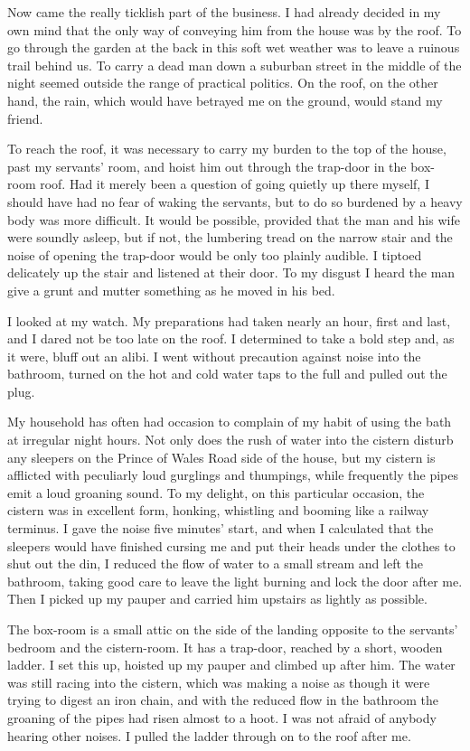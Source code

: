 Now came the really ticklish part of the business. I had already decided in my own mind that the only way of conveying him from the house was by the roof. To go through the garden at the back in this soft wet weather was to leave a ruinous trail behind us. To carry a dead man down a suburban street in the middle of the night seemed outside the range of practical politics. On the roof, on the other hand, the rain, which would have betrayed me on the ground, would stand my friend.

To reach the roof, it was necessary to carry my burden to the top of the house, past my servants' room, and hoist him out through the trap-door in the box-room roof. Had it merely been a question of going quietly up there myself, I should have had no fear of waking the servants, but to do so burdened by a heavy body was more difficult. It would be possible, provided that the man and his wife were soundly asleep, but if not, the lumbering tread on the narrow stair and the noise of opening the trap-door would be only too plainly audible. I tiptoed delicately up the stair and listened at their door. To my disgust I heard the man give a grunt and mutter something as he moved in his bed.

I looked at my watch. My preparations had taken nearly an hour, first and last, and I dared not be too late on the roof. I determined to take a bold step and, as it were, bluff out an alibi. I went without precaution against noise into the bathroom, turned on the hot and cold water taps to the full and pulled out the plug.

My household has often had occasion to complain of my habit of using the bath at irregular night hours. Not only does the rush of water into the cistern disturb any sleepers on the Prince of Wales Road side of the house, but my cistern is afflicted with peculiarly loud gurglings and thumpings, while frequently the pipes emit a loud groaning sound. To my delight, on this particular occasion, the cistern was in excellent form, honking, whistling and booming like a railway terminus. I gave the noise five minutes' start, and when I calculated that the sleepers would have finished cursing me and put their heads under the clothes to shut out the din, I reduced the flow of water to a small stream and left the bathroom, taking good care to leave the light burning and lock the door after me. Then I picked up my pauper and carried him upstairs as lightly as possible.

The box-room is a small attic on the side of the landing opposite to the servants' bedroom and the cistern-room. It has a trap-door, reached by a short, wooden ladder. I set this up, hoisted up my pauper and climbed up after him. The water was still racing into the cistern, which was making a noise as though it were trying to digest an iron chain, and with the reduced flow in the bathroom the groaning of the pipes had risen almost to a hoot. I was not afraid of anybody hearing other noises. I pulled the ladder through on to the roof after me.

